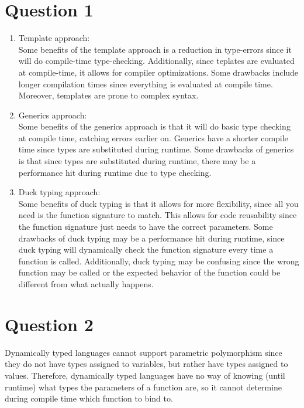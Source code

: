 \documentclass[13pt]{article}
\begin{document}
\section*{Question 1}
\begin{enumerate}[label=(\alph*)]
\item Template approach: \\
  Some benefits of the template approach is a reduction in type-errors
  since it will do compile-time type-checking. Additionally, since
  teplates are evaluated at compile-time, it allows for compiler
  optimizations. Some drawbacks include longer compilation times since
  everything is evaluated at compile time. Moreover, templates are
  prone to complex syntax.

\item Generics approach: \\
  Some benefits of the generics approach is that it will do basic type
  checking at compile time, catching errors earlier on. Generics have
  a shorter compile time since types are substituted during
  runtime. Some drawbacks of generics is that since types are
  substituted during runtime, there may be a performance hit during
  runtime due to type checking.

\item Duck typing approach: \\
  Some benefits of duck typing is that it allows for more flexibility,
  since all you need is the function signature to match. This allows
  for code reusability since the function signature just needs to have
  the correct parameters. Some drawbacks of duck typing may be a
  performance hit during runtime, since duck typing will dynamically
  check the function signature every time a function is
  called. Additionally, duck typing may be confusing since the wrong
  function may be called or the expected behavior of the function
  could be different from what actually happens.
\end{enumerate}

\newpage
\section*{Question 2}
Dynamically typed languages cannot support parametric polymorphism
since they do not have types assigned to variables, but rather have
types assigned to values. Therefore, dynamically typed languages have
no way of knowing (until runtime) what types the parameters of a
function are, so it cannot determine during compile time which
function to bind to.
\end{document}
